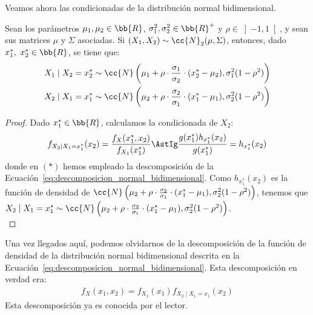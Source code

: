 Veamos ahora las condicionadas de la distribución normal bidimensional.
\begin{prop}
    Sean los parámetros $\mu_1, \mu_2\in \bb{R}$, $\sigma_1^2, \sigma_2^2\in \bb{R}^+$ y $\rho\in \left]-1,1\right[$, y sean sus matrices $\mu$ y $\Sigma$ asociadas.
    Si $(X_1, X_2)\sim \cc{N}_2(\mu, \Sigma)$, entonces, dado $x_1^\ast,~x_2^\ast\in \bb{R}$, se tiene que:
    \begin{align*}
        X_1\mid X_2=x_2^\ast &\sim \cc{N}\left(\mu_1+\rho\cdot \frac{\sigma_1}{\sigma_2}\cdot (x_2^\ast-\mu_2), \sigma_1^2(1-\rho^2)\right)\\
        X_2\mid X_1=x_1^\ast &\sim \cc{N}\left(\mu_2+\rho\cdot \frac{\sigma_2}{\sigma_1}\cdot (x_1^\ast-\mu_1), \sigma_2^2(1-\rho^2)\right)
    \end{align*}
\end{prop}
\begin{proof}
    Dado $x_1^\ast\in \bb{R}$, calculamos la condicionada de $X_2$:
    \begin{equation*}
        f_{X_2\mid X_1=x_1^\ast}(x_2)=\dfrac{f_X(x_1^\ast, x_2)}{f_{X_1}(x_1^\ast)}
        \AstIg \dfrac{g(x_1^\ast)h_{x_1^\ast}(x_2)}{g(x_1^\ast)}
        = h_{x_1^\ast}(x_2)
    \end{equation*}
    donde en $(\ast)$ hemos empleado la descomposición de la Ecuación~\ref{eq:descomposicion_normal_bidimensional}. Como $h_{x_1^\ast}(x_2)$ es la función de densidad de $\cc{N}\left(\mu_2+\rho\cdot \frac{\sigma_2}{\sigma_1}\cdot (x_1^\ast-\mu_1), \sigma_2^2(1-\rho^2)\right)$, tenemos que $X_2\mid X_1=x_1^\ast\sim \cc{N}\left(\mu_2+\rho\cdot \frac{\sigma_2}{\sigma_1}\cdot (x_1^\ast-\mu_1), \sigma_2^2(1-\rho^2)\right)$.\\
\end{proof}
\begin{observacion}
    Una vez llegados aquí, podemos olvidarnos de la descomposición de la función de densidad de la distribución normal bidimensional descrita en la Ecuación~\ref{eq:descomposicion_normal_bidimensional}.
    Esta descomposición en verdad era:
    \begin{align*}
        f_{X}(x_1,x_2) = f_{X_1}(x_1)f_{X_2\mid X_1=x_1}(x_2)
    \end{align*}
    Esta descomposición ya es conocida por el lector.
\end{observacion}


